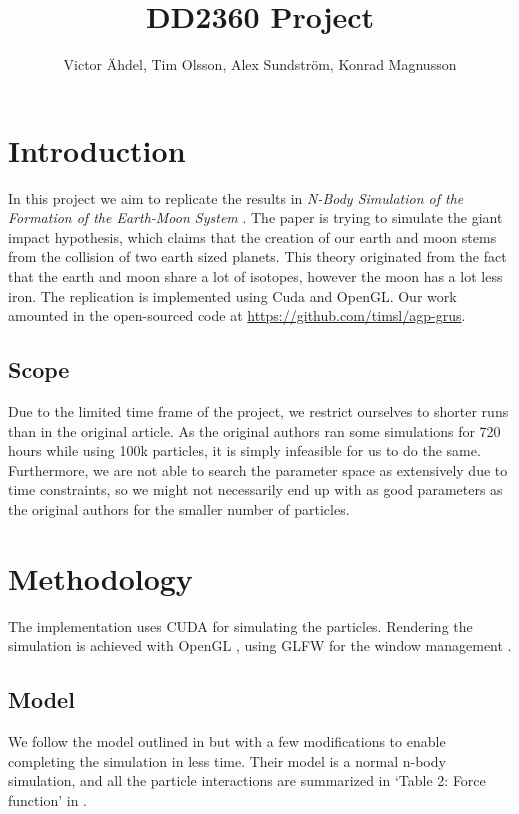 \documentclass[a4paper]{article}
\title{DD2360 Project}
\author{Victor Ähdel, Tim Olsson, Alex Sundström, Konrad Magnusson}
\begin{document}
\maketitle

\section{Introduction}

In this project we aim to replicate the results in \emph{N-Body Simulation of the Formation of the Earth-Moon System} \cite{simulation_paper}.
The paper is trying to simulate the giant impact hypothesis, which claims that the creation of our earth and moon stems from the collision of two earth sized planets.
This theory originated from the fact that the earth and moon share a lot of isotopes, however the moon has a lot less iron.
The replication is implemented using Cuda and OpenGL.
Our work amounted in the open-sourced code at \url{https://github.com/timsl/agp-grus}.




\subsection{Scope}

Due to the limited time frame of the project, we restrict ourselves to shorter runs than in the original article.
As the original authors ran some simulations for 720 hours while using 100k particles, it is simply infeasible for us to do the same.
Furthermore, we are not able to search the parameter space as extensively due to time constraints, so we might not necessarily end up with as good parameters as the original authors for the smaller number of particles.

\section{Methodology}

The implementation uses CUDA \cite{Cuda} for simulating the particles.
Rendering the simulation is achieved with OpenGL \cite{opengl}, using GLFW for the window management \cite{glfw}.

\subsection{Model}

We follow the model outlined in \cite{simulation_paper} but with a few modifications to enable completing the simulation in less time.
Their model is a normal n-body simulation, and all the particle interactions are summarized in `Table 2: Force function' in \cite{simulation_paper}.
\end{document}
